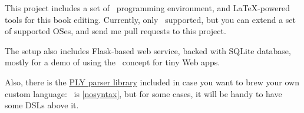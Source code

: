 \clearpage
{}\label{install}


\noindent
This project includes a set of \py\ programming environment, and \LaTeX-powered
tools for this book editing. Currently, only \lin\ supported, but you can extend
a set of supported OSes, and send me pull requests to this project.

\clearpage
{}

\clearpage
\noindent
The setup also includes Flask-based web service, backed with SQLite database,
mostly for a demo of using the \mel\ concept for tiny Web apps.

\medskip
{}

Also, there is the \href{https://www.dabeaz.com/ply/}{PLY parser library}
included in case you want to brew your own custom language: \mel\ is
 \ref{nosyntax}, but for some cases, it will be handy
to have some DSLs above it.

